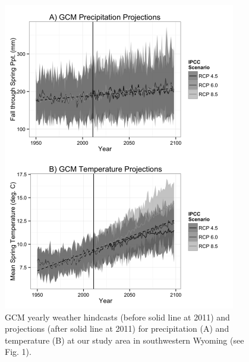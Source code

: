 \documentclass[12pt,]{article}
\begin{document}
\newpage{}

\begin{figure}[!ht]
  \centering
      \includegraphics[width=4in]{../figures/weather_projections.png}
  \caption{GCM yearly weather hindcasts (before solid line at 2011) and projections (after solid line at 2011) for precipitation (A) and temperature (B) at our study area in southwestern Wyoming (see Fig. 1).}
\end{figure}

\newpage{}
\end{document}
